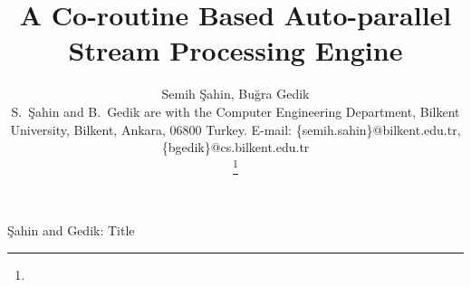 



  \title{A Co-routine Based Auto-parallel Stream Processing Engine}

  \author
  {
    Semih \c{S}ahin,
    Bu\u{g}ra Gedik
    \IEEEcompsocitemizethanks
    {

      \IEEEcompsocthanksitem S.\ \c{S}ahin and B.\ Gedik
             are with the
             Computer Engineering Department, Bilkent
             University, Bilkent, Ankara, 06800 Turkey. E-mail:
             \{semih.sahin\}@bilkent.edu.tr, \{bgedik\}@cs.bilkent.edu.tr
    }%
    \thanks{}
  }

           {\c{Sahin} and Gedik: Title}
  \IEEEcompsoctitleabstractindextext{}
  \maketitle

  \IEEEpeerreviewmaketitle

  
  
  

  
  


